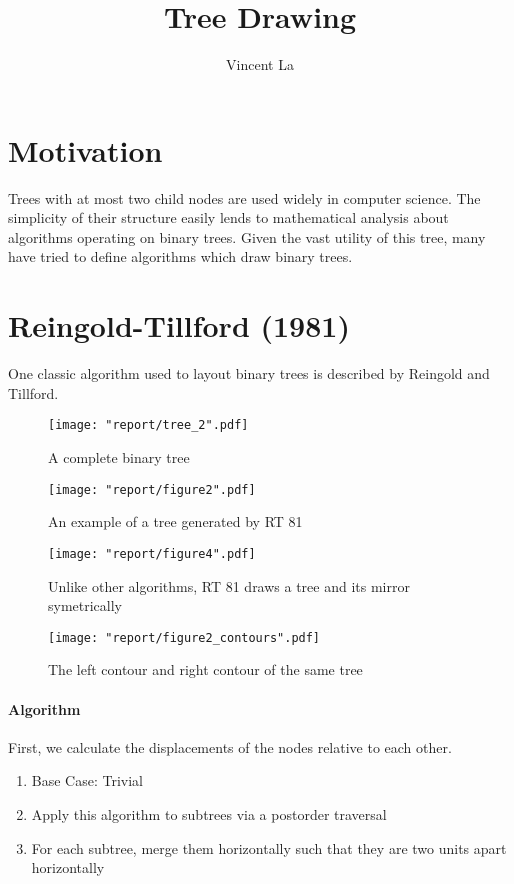 \documentclass[11pt]{article}
\title{Tree Drawing}
\author{Vincent La}
\begin{document}
\maketitle

\section*{Motivation}
Trees with at most two child nodes are used widely in computer science. The simplicity of their structure easily lends to mathematical analysis about algorithms operating on binary trees. Given the vast utility of this tree, many have tried to define algorithms which draw binary trees.

\section*{Reingold-Tillford (1981)}
One classic algorithm used to layout binary trees is described by Reingold and Tillford. 

\begin{figure}[H]
    \texttt{[image: "report/tree\_2".pdf]}
    \caption{A complete binary tree}
\end{figure}

\begin{figure}[H]
    \centering
    \texttt{[image: "report/figure2".pdf]}
    \caption{An example of a tree generated by RT 81}
\end{figure}

\begin{figure}[H]
    \centering
    \texttt{[image: "report/figure4".pdf]}
    \caption{Unlike other algorithms, RT 81 draws a tree and its mirror symetrically}
\end{figure}

\begin{figure}[H]
    \texttt{[image: "report/figure2\_contours".pdf]}
    \caption{The left contour and right contour of the same tree}
\end{figure}

\paragraph{Algorithm}

First, we calculate the displacements of the nodes relative to each other.

\begin{enumerate}
    \item Base Case: Trivial
    \item Apply this algorithm to subtrees via a postorder traversal
    \item For each subtree, merge them horizontally such that they are two units apart horizontally
\end{enumerate}
\end{document}
